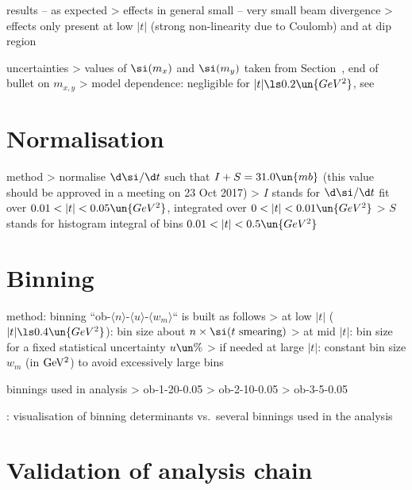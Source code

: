 \> results -- as expected
\>> effects in general small -- very small beam divergence
\>> effects only present at low $|t|$ (strong non-linearity due to Coulomb) and at dip region

\> uncertainties
\>> values of $\si(m_x)$ and $\si(m_y)$ taken from Section~, end of bullet on $m_{x,y}$
\>> model dependence: negligible for $|t| \ls 0.2\un{GeV^2}$, see 



\chapter[normalisation]{Normalisation}

\> method
\>> normalise $\d\si/\d t$ such that $I + S = 31.0\un{mb}$ (this value should be approved in a meeting on 23 Oct 2017)
\>> $I$ stands for $\d\si/\d t$ fit over $0.01 < |t| < 0.05\un{GeV^2}$, integrated over $0 < |t| < 0.01\un{GeV^2}$
\>> $S$ stands for histogram integral of bins $0.01 < |t| < 0.5\un{GeV^2}$



\chapter[binning]{Binning}

\> method: binning ``ob-$\langle n\rangle$-$\langle u\rangle$-$\langle w_m\rangle$`` is built as follows
\>> at low $|t|$ ($|t| \ls 0.4\un{GeV^2}$): bin size about $n\times \si(\hbox{$t$ smearing})$
\>> at mid $|t|$: bin size for a fixed statistical uncertainty $u\un{\%}$
\>> if needed at large $|t|$: constant bin size $w_m$ (in $\rm GeV^2$) to avoid excessively large bins

\> binnings used in analysis
\>> ob-1-20-0.05
\>> ob-2-10-0.05
\>> ob-3-5-0.05

\>  : visualisation of binning determinants vs.~several binnings used in
the analysis



\chapter[validation]{Validation of analysis chain}

